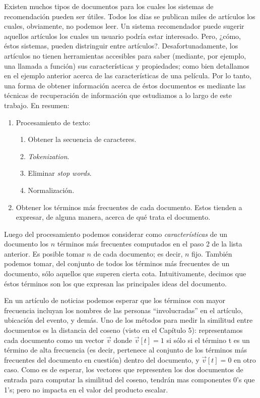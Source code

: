 			Existen muchos tipos de documentos para los cuales los sistemas de recomendación pueden ser útiles. Todos los días se publican miles de artículos los cuales, obviamente, no podemos leer. Un sistema recomendador puede sugerir aquellos artículos los cuales un usuario podría estar interesado. Pero, ¿cómo, éstos sistemas, pueden distringuir entre artículos?. Desafortunadamente, los artículos no tienen herramientas accesibles para saber (mediante, por ejemplo, una llamada a función) sus características y propiedades; como bien detallamos en el ejemplo anterior acerca de las características de una película. Por lo tanto, una forma de obtener información acerca de éstos documentos es mediante las técnicas de recuperación de información que estudiamos a lo largo de este trabajo. En resumen:
			\begin{enumerate}
				\item Procesamiento de texto:
					\begin{enumerate}
						\item Obtener la secuencia de caracteres.
						\item \textit{Tokenization}.
						\item Eliminar \textit{stop words}.
						\item Normalización.
					\end{enumerate}			
				 \item Obtener los términos más frecuentes de cada documento. Estos tienden a expresar, de alguna manera, acerca de qué trata el documento.					
			\end{enumerate}
			\par
			Luego del procesamiento podemos considerar como \textit{características} de un documento los $n$ términos más frecuentes computados en el paso 2 de la lista anterior. Es posible tomar $n$ de cada documento; es decir, $n$ fijo. También podemos tomar, del conjunto de todos los términos más frecuentes de un documento, sólo aquellos que superen cierta cota. Intuitivamente, decimos que éstos términos son los que expresan las principales ideas del documento. \par
			En un artículo de noticias podemos esperar que los términos con mayor frecuencia incluyan los nombres de las personas \enquote{involucradas} en el artículo, ubicación del evento, y demás. Uno de los métodos para medir la similitud entre documentos es la distancia del coseno (visto en el Capítulo 5): representamos cada documento como un vector $\vec{v}$ donde $\vec{v}[t] = 1$ si sólo si el término t es un término de alta frecuencia (es decir, pertenece al conjunto de los términos más frecuentes del documento en cuestión) dentro del documento, y $\vec{v}[t] = 0$ en otro caso. Como es de esperar, los vectores que representen los dos documentos de entrada para computar la similitud del coseno, tendrán mas componentes 0's que 1's; pero no impacta en el valor del producto escalar. \par
			
